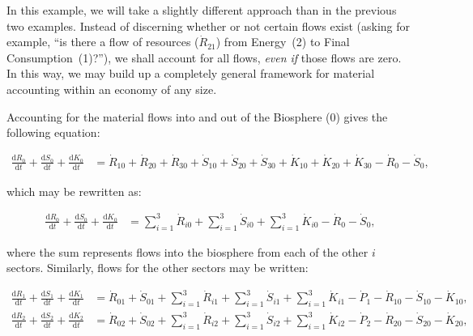 In this example, we will take a slightly different approach
than in the previous two examples. 
Instead of discerning whether or not certain flows exist
(asking for example,
``is there a flow of resources ($\dot{R}_{21}$) from
Energy~(2) to Final Consumption~(1)?''),
we shall account for all flows,
\emph{even if} those flows are zero.
In this way,
we may build up a completely general
framework for material accounting within an economy
of any size.

Accounting for the material flows 
into and out of the Biosphere
(0) gives the following equation:

\begin{align} \label{eq:C_CV_0}
	\frac{\mathrm{d}R_{0}}{\mathrm{d}t} 
	+ \frac{\mathrm{d}S_{0}}{\mathrm{d}t}	
	+ \frac{\mathrm{d}K_0}{\mathrm{d}t}		
	& =  \dot{R}_{10} + \dot{R}_{20} + \dot{R}_{30}
	+ \dot{S}_{10} + \dot{S}_{20} + \dot{S}_{30}
	+ \dot{K}_{10} + \dot{K}_{20} + \dot{K}_{30}
	- \dot{R}_{0} 
	- \dot{S}_{0},
\end{align}

\noindent{}which may be rewritten as:

\begin{align} \label{eq:C_CV_0_b}
	\frac{\mathrm{d}R_{0}}{\mathrm{d}t} 
	+ \frac{\mathrm{d}S_{0}}{\mathrm{d}t}	
	+ \frac{\mathrm{d}K_0}{\mathrm{d}t}		
	& =  \sum_{i = 1}^{3}\dot{R}_{i0}
	+ \sum_{i = 1}^{3}\dot{S}_{i0}
	+ \sum_{i = 1}^{3}\dot{K}_{i0}
	- \dot{R}_{0} 
	- \dot{S}_{0},
\end{align}

\noindent{}where the sum represents flows
into the biosphere from each of the other $i$ sectors.
Similarly, flows for the other sectors may be written:

\begin{align} \label{eq:C_CV_1}
	\frac{\mathrm{d}R_{1}}{\mathrm{d}t} 
	+ \frac{\mathrm{d}S_{1}}{\mathrm{d}t}	
	+ \frac{\mathrm{d}K_{1}}{\mathrm{d}t}		
	& =  \dot{R}_{01} 
	+ \dot{S}_{01}
	+ \sum_{i = 1}^{3}\dot{R}_{i1}
	+ \sum_{i = 1}^{3}\dot{S}_{i1}
	+ \sum_{i = 1}^{3}\dot{K}_{i1}
	- \dot{P}_{1}
	- \dot{R}_{10} 
	- \dot{S}_{10}
	- \dot{K}_{10},										\\
	\label{eq:C_CV_2}
	\frac{\mathrm{d}R_{2}}{\mathrm{d}t} 
	+ \frac{\mathrm{d}S_{2}}{\mathrm{d}t}	
	+ \frac{\mathrm{d}K_{2}}{\mathrm{d}t}		
	& =  \dot{R}_{02} 
	+ \dot{S}_{02}
	+ \sum_{i = 1}^{3}\dot{R}_{i2}
	+ \sum_{i = 1}^{3}\dot{S}_{i2}
	+ \sum_{i = 1}^{3}\dot{K}_{i2}
	- \dot{P}_{2}
	- \dot{R}_{20} 
	- \dot{S}_{20}
	- \dot{K}_{20},
\end{align}

